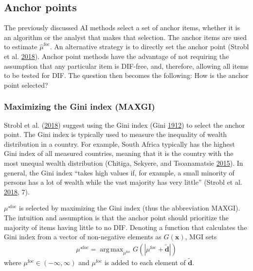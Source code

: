 \documentclass[
  11pt,
]{article}
\begin{document}
\hypertarget{anchor-points}{%
\subsection{Anchor points}\label{anchor-points}}

The previously discussed AI methods select a set of anchor items, whether it is an algorithm or the analyst that makes that selection. The anchor items are used to estimate \(\hat \mu^\text{foc}\). An alternative strategy is to directly set the anchor point (Strobl et al. \protect\hyperlink{ref-strobl2018anchor}{2018}). Anchor point methods have the advantage of not requiring the assumption that any particular item is DIF-free, and, therefore, allowing all items to be tested for DIF. The question then becomes the following: How is the anchor point selected?

\hypertarget{maximizing-the-gini-index-maxgi}{%
\subsubsection{Maximizing the Gini index (MAXGI)}\label{maximizing-the-gini-index-maxgi}}

Strobl et al. (\protect\hyperlink{ref-strobl2018anchor}{2018}) suggest using the Gini index (Gini \protect\hyperlink{ref-gini1912variabilita}{1912}) to select the anchor point. The Gini index is typically used to measure the inequality of wealth distribution in a country. For example, South Africa typically has the highest Gini index of all measured countries, meaning that it is the country with the most unequal wealth distribution (Chitiga, Sekyere, and Tsoanamatsie \protect\hyperlink{ref-chitiga2015income}{2015}). In general, the Gini index \enquote{takes high values if, for example, a small minority of persons has a lot of wealth while the vast majority has very little} (Strobl et al. \protect\hyperlink{ref-strobl2018anchor}{2018}, 7).

\(\mu^{\star\text{foc}}\) is selected by maximizing the Gini index (thus the abbreviation MAXGI). The intuition and assumption is that the anchor point should prioritize the majority of items having little to no DIF. Denoting a function that calculates the Gini index from a vector of non-negative elements as \(G(\mathbf{x})\), MGI sets
\begin{align}
\mu^{\star\text{foc}} = \mathop\mathrm{arg\,max}_{\mu^\text{foc}} G(|\mu^\text{foc} + \tilde{\mathbf{d}}|)
\end{align}
where \(\mu^\text{foc} \in (-\infty, \infty)\) and \(\mu^\text{foc}\) is added to each element of \(\tilde{\mathbf{d}}\).
\end{document}
